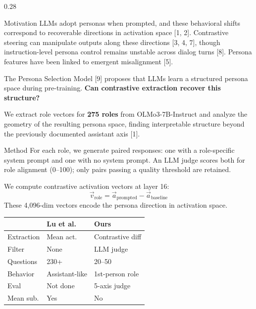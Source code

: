 \documentclass[final,t]{beamer}
\begin{document}
\begin{frame}[t]
\vspace{1mm}

\begin{columns}[T]

\begin{column}{0.28\textwidth}

\begin{block}{Motivation}
LLMs adopt personas when prompted, and these behavioral shifts
correspond to recoverable directions in activation space [1, 2].
Contrastive steering can manipulate outputs along these
directions [3, 4, 7], though instruction-level persona control
remains unstable across dialog turns [8]. Persona features have
been linked to emergent misalignment [5].

The Persona Selection Model [9] proposes that LLMs learn a
structured persona space during pre-training. \textbf{Can
contrastive extraction recover this structure?}

We extract role vectors for \textbf{275 roles} from
OLMo3-7B-Instruct and analyze the geometry of the resulting
persona space, finding interpretable structure beyond the
previously documented assistant axis [1].
\end{block}

\begin{block}{Method}
For each role, we generate paired responses: one with a
role-specific system prompt and one with no system prompt.
An LLM judge scores both for role alignment (0--100); only
pairs passing a quality threshold are retained.

We compute contrastive activation vectors at layer 16:
\[\vec{v}_{\text{role}} = \vec{a}_{\text{prompted}} - \vec{a}_{\text{baseline}}\]
These 4,096-dim vectors encode the persona direction in
activation space.

\vspace{2pt}
\begin{hlbox}
\renewcommand{\arraystretch}{1.1}
\begin{tabular}{@{}lll@{}}
\toprule
& \textbf{Lu et al.} & \textbf{Ours} \\
\midrule
Extraction & Mean act. & Contrastive diff \\
Filter & None & LLM judge \\
Questions & 230+ & 20--50 \\
Behavior & Assistant-like & 1st-person role \\
Eval & Not done & 5-axis judge \\
Mean sub. & Yes & No \\
\bottomrule
\end{tabular}
\end{hlbox}


\end{block}
\end{column}
\end{columns}
\end{frame}
\end{document}
